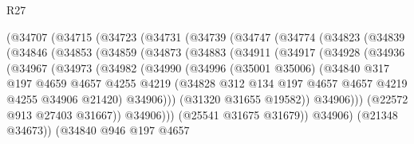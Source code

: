 \begin{lexlean}{R27}
\begin{coremodule}
        (@34707
          (@34715
            (@34723
              (@34731
                (@34739
                  (@34747
                    (@34774
                      (@34823
                        (@34839
                          (@34846
                            (@34853
                              (@34859
                                (@34873
                                  (@34883
                                    (@34911
                                      (@34917
                                        (@34928
                                          (@34936
                                            (@34967
                                              (@34973
                                                (@34982
                                                  (@34990
                                                    (@34996
                                                      (@35001 @35006)
                                                      (@34840
                                                        @317
                                                        @197
                                                        @4659
                                                        @4657
                                                        @4255
                                                        @4219
                                                        (@34828
                                                          @312
                                                          @134
                                                          @197
                                                          @4657
                                                          @4657
                                                          @4219
                                                          @4255
                                                          @34906
                                                          @21420)
                                                        @34906)))
                                                  (@31320 @31655 @19582))
                                                @34906)))
                                          (@22572 @913 @27403 @31667))
                                        @34906)))
                                  (@25541 @31675 @31679))
                                @34906)
                              (@21348 @34673))
                            (@34840
                              @946
                              @197
                              @4657

\end{coremodule}
\end{lexlean}
